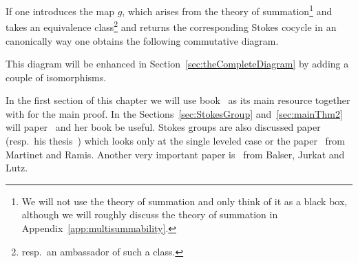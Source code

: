 If one introduces the map $g$, which arises from the theory of
summation\footnote{We will not use the theory of summation and only think of it
  as a black box, although we will roughly discuss the theory of summation in
  Appendix~\ref{app:multisummability}.} and takes an equivalence
class\footnote{resp.\ an ambassador of such a class.} and returns the
corresponding Stokes cocycle in an canonically way one obtains the following
commutative diagram.
\begin{center}
\end{center}\label{page:ofPreDiagram}
This diagram will be enhanced in Section~\ref{sec:theCompleteDiagram} by
adding a couple of isomorphisms.

In the first section of this chapter we will use
 book~\cite[section II]{sabbah2007isomonodromic} as its main
resource together with \cite{babbitt1989local} for the main proof.
In the Sections~\ref{sec:StokesGroup} and~\ref{sec:mainThm2} will
 paper~\cite{Loday1994} and her book
\cite[Sec.4]{Loday2014} be useful.
Stokes groups are also discussed  paper~\cite{boalch} (resp.\
his thesis~\cite{thboalch}) which looks only at the single leveled case or the
paper~\cite{Martinet1991} from Martinet and Ramis.
Another very important paper is~\cite{BJL1979Birkhoff} from Balser, Jurkat and
Lutz.

